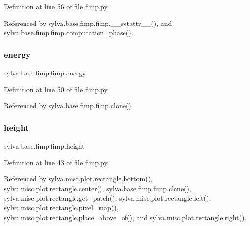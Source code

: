 Definition at line 56 of file fimp.\+py.



Referenced by sylva.\+base.\+fimp.\+fimp.\+\_\+\+\_\+setattr\+\_\+\+\_\+(), and sylva.\+base.\+fimp.\+fimp.\+computation\+\_\+phase().

\mbox{\label{classsylva_1_1base_1_1fimp_1_1fimp_a70e3d3e9ddf525857936814218df1b4b}} 
\subsubsection{\texorpdfstring{energy}{energy}}
{\footnotesize\ttfamily sylva.\+base.\+fimp.\+fimp.\+energy}



Definition at line 50 of file fimp.\+py.



Referenced by sylva.\+base.\+fimp.\+fimp.\+clone().

\mbox{\label{classsylva_1_1base_1_1fimp_1_1fimp_a78a56a561ea60125f7d26416f0ed3130}} 
\subsubsection{\texorpdfstring{height}{height}}
{\footnotesize\ttfamily sylva.\+base.\+fimp.\+fimp.\+height}



Definition at line 43 of file fimp.\+py.



Referenced by sylva.\+misc.\+plot.\+rectangle.\+bottom(), sylva.\+misc.\+plot.\+rectangle.\+center(), sylva.\+base.\+fimp.\+fimp.\+clone(), sylva.\+misc.\+plot.\+rectangle.\+get\+\_\+patch(), sylva.\+misc.\+plot.\+rectangle.\+left(), sylva.\+misc.\+plot.\+rectangle.\+pixel\+\_\+map(), sylva.\+misc.\+plot.\+rectangle.\+place\+\_\+above\+\_\+of(), and sylva.\+misc.\+plot.\+rectangle.\+right().

\mbox{\label{classsylva_1_1base_1_1fimp_1_1fimp_a21147e520263c3af6d9ca04a4043f81c}} 
